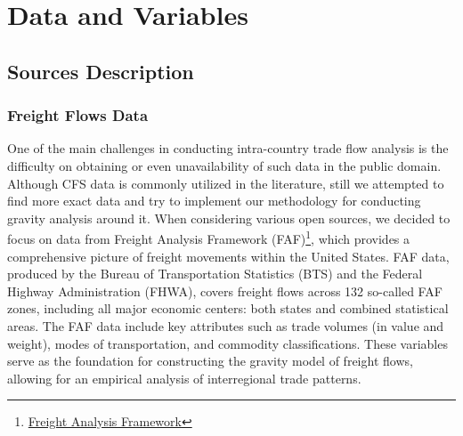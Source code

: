 \section{Data and Variables} 
\label{sec: data}

\subsection{Sources Description}

\subsubsection{Freight Flows Data}

One of the main challenges in conducting intra-country trade flow analysis is the difficulty on obtaining or even unavailability of such data in the public domain. Although CFS data is commonly utilized in the literature, still we attempted to find more exact data and try to implement our methodology for conducting gravity analysis around it. When considering various open sources, we decided to focus on data from Freight Analysis Framework (FAF)\footnote{ \href{https://www.bts.gov/faf}{Freight Analysis Framework}}, which provides a comprehensive picture of freight movements within the United States. FAF data, produced by the Bureau of Transportation Statistics (BTS) and the Federal Highway Administration (FHWA), covers freight flows across 132 so-called FAF zones, including all major economic centers: both states and combined statistical areas. The FAF data include key attributes such as trade volumes (in value and weight), modes of transportation, and commodity classifications. These variables serve as the foundation for constructing the gravity model of freight flows, allowing for an empirical analysis of interregional trade patterns.

